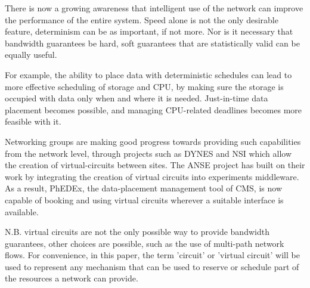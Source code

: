 There is now a growing awareness that intelligent use of the network can improve the performance of the entire system\cite{TW_DB}. Speed alone is not the only desirable feature, determinism can be as important, if not more. Nor is it necessary that bandwidth guarantees be hard, soft guarantees that are statistically valid can be equally useful.

For example, the ability to place data with deterministic schedules can lead to more effective scheduling of storage and CPU, by making sure the storage is occupied with data only when and where it is needed. Just-in-time data placement becomes possible, and managing CPU-related deadlines becomes more feasible with it.

Networking groups are making good progress towards providing such capabilities from the network level, through projects such as DYNES\cite{DYNES} and NSI\cite{NSI} which allow the creation of virtual-circuits between sites. The ANSE\cite{ANSE} project has built on their work by integrating the creation of virtual circuits into experiments middleware. As a result, PhEDEx\cite{PhEDEx}, the data-placement management tool of CMS, is now capable of booking and using virtual circuits wherever a suitable interface is available.

N.B. virtual circuits are not the only possible way to provide bandwidth guarantees, other choices are possible, such as the use of multi-path network flows. For convenience, in this paper, the term 'circuit' or 'virtual circuit' will be used to represent any mechanism that can be used to reserve or schedule part of the resources a network can provide.